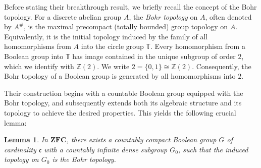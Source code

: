 \documentclass[12pt]{amsart}
\newtheorem{lemma}[theorem]{Lemma}
\theoremstyle{definition}
\numberwithin{equation}{section}
\theoremstyle{remark}
\begin{document}
Before stating their breakthrough result, we briefly recall the concept of the Bohr topology. For a discrete abelian group $A$, the \emph{Bohr topology} on $A$, often denoted by $A^\#$, is the maximal precompact (totally bounded) group topology on $A$. Equivalently, it is the initial topology induced by the family of all homomorphisms from $A$ into the circle group $\mathbb{T}$. Every homomorphism from a Boolean group into $\mathbb{T}$ has image contained in the unique subgroup of order $2$, which we identify with $\mathbb{Z}(2)$.  We write $2=\{0,1\}\cong\mathbb{Z}(2)$. Consequently, the Bohr topology of a Boolean group is generated by all homomorphisms into $2$.

Their construction begins with a countable Boolean group equipped with the Bohr topology, and subsequently extends both its algebraic structure and its topology to achieve the desired properties. This yields the following crucial lemma:

\begin{lemma}\label{Le0}
In $\mathbf{ZFC}$, there exists a countably compact Boolean group $G$ of cardinality $\mathfrak{c}$ with a countably infinite dense subgroup $G_0$, such that the induced topology on $G_0$ is the Bohr topology.
\end{lemma}
\end{document}

